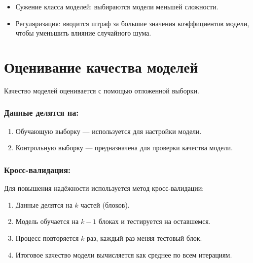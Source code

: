 \begin{itemize}
\tightlist
\item
  Сужение класса моделей: выбираются модели меньшей сложности.
\item
  Регуляризация: вводится штраф за большие значения
  коэффициентов модели, чтобы уменьшить влияние случайного шума.
\end{itemize}

\hypertarget{ux43eux446ux435ux43dux438ux432ux430ux43dux438ux435-ux43aux430ux447ux435ux441ux442ux432ux430-ux43cux43eux434ux435ux43bux435ux439}{%
\section{Оценивание качества
моделей}\label{ux43eux446ux435ux43dux438ux432ux430ux43dux438ux435-ux43aux430ux447ux435ux441ux442ux432ux430-ux43cux43eux434ux435ux43bux435ux439}}

Качество моделей оценивается с помощью отложенной выборки.

\hypertarget{ux434ux430ux43dux43dux44bux435-ux434ux435ux43bux44fux442ux441ux44f-ux43dux430}{%
\subsubsection*{Данные делятся
на:}\label{ux434ux430ux43dux43dux44bux435-ux434ux435ux43bux44fux442ux441ux44f-ux43dux430}}

\begin{enumerate}
\def\labelenumi{\arabic{enumi}.}
\tightlist
\item
  Обучающую выборку --- используется для настройки модели.
\item
  Контрольную выборку --- предназначена для проверки качества
  модели.
\end{enumerate}

\hypertarget{ux43aux440ux43eux441ux441-ux432ux430ux43bux438ux434ux430ux446ux438ux44f}{%
\subsubsection*{Кросс-валидация:}\label{ux43aux440ux43eux441ux441-ux432ux430ux43bux438ux434ux430ux446ux438ux44f}}

Для повышения надёжности используется метод кросс-валидации: 
\begin{enumerate}
\def\labelenumi{\arabic{enumi}.}
\tightlist
\item 
Данные делятся на \(k\) частей (блоков). 
\item 
Модель обучается на \(k-1\) блоках и
тестируется на оставшемся. 
\item 
Процесс повторяется \(k\) раз, каждый раз
меняя тестовый блок. 
\item 
Итоговое качество модели вычисляется как среднее
по всем итерациям.
\end{enumerate}

